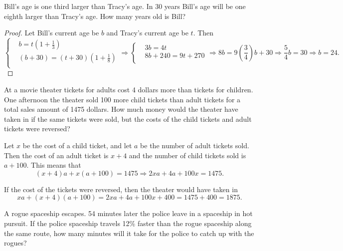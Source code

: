 \documentclass{article}
\begin{document}
\begin{example}
    Bill's age is one third larger than Tracy's age. In 30 years Bill's age will be one eighth larger than Tracy's age. How many years old is Bill?
\end{example}

\begin{proof}
    Let Bill's current age be $b$ and Tracy's current age be $t.$ Then 
    \[
        \begin{cases}
            &b = t \left(1 + \frac{1}{3}\right)\\
            &(b+30) = (t+30)\left(1 + \frac{1}{8}\right)\\
        \end{cases}
        \Rightarrow
        \begin{cases}
            &3b = 4t\\
            &8b+240 = 9t+270\\
        \end{cases}
        \Rightarrow 
        8b = 9\left( \frac{3}{4}\right) b + 30 
        \Rightarrow \frac{5}{4} b =30 \Rightarrow b = \boxed{24.}
    \]
\end{proof}

\begin{example}
    At a movie theater tickets for adults cost 4 dollars more than tickets for children.
    One afternoon the theater sold 100 more child tickets than adult tickets for a total sales amount of 1475 dollars.
    How much money would the theater have taken in if the same tickets were sold,
    but the costs of the child tickets and adult tickets were reversed?
\end{example}

\begin{soln}
    Let $x$ be the cost of a child ticket, and let $a$ be the number of adult tickets sold.
    Then the cost of an adult ticket is $x+4$ and the number of child tickets sold is $a+100.$
    This means that
    \[
        (x+4)a + x(a+100) = 1475 \Rightarrow 2xa + 4a + 100x = 1475.
    \]

    If the cost of the tickets were reversed, then the theater would have taken in
    \[
        xa + (x+4)(a+100) = 2xa + 4a + 100x + 400 = 1475 + 400 = \boxed{1875.}
    \]
\end{soln}

\begin{example}
    A rogue spaceship escapes. 54 minutes later the police leave in a spaceship in hot pursuit.
    If the police spaceship travels 12\% faster than the rogue spaceship along the same route,
    how many minutes will it take for the police to catch up with the rogues?
\end{example}
\end{document}
